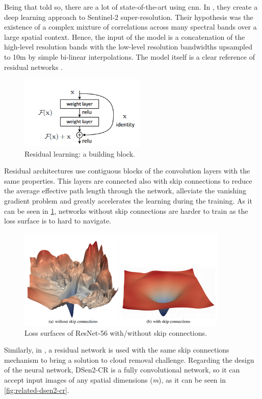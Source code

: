 \documentclass[../main.tex]{subfiles}
\begin{document}
Being that told so, there are a lot of state-of-the-art using \gls{cnn}. In \cite{LANARAS2018305}, they create a deep learning approach to Sentinel-2 super-resolution. Their hypothesis was the existence of a complex mixture of correlations across many spectral bands over a large spatial context. Hence, the input of the model is a concatenation of the high-level resolution bands with the low-level resolution bandwidths upsampled to 10m by simple bi-linear interpolations. The model itself is a clear reference of residual networks \cite{he2016deep}.
\begin{figure}[H]
	\centering
	\includegraphics[width=6cm]{imgs/relatedwork/residualblock.png}
	\caption{Residual learning: a building block.}
\end{figure}
Residual architectures use contiguous blocks of the convolution layers with the same properties. This layers are connected also with skip connections to reduce the average effective path length through the network, alleviate the vanishing gradient problem and greatly accelerates the learning during the training.  As it can be seen in \ref{fig:related-residual-loss}, networks without skip connections are harder to train as the loss surface is to hard to navigate. \cite{NEURIPS2018_a41b3bb3}
\begin{figure}[H]
	\centering
	\includegraphics[width=10cm]{imgs/relatedwork/resloss.png}
	\caption{Loss surfaces of ResNet-56 with/without skip connections.}
	\label{fig:related-residual-loss}
\end{figure}
Similarly, in \cite{Meraner2020}, a residual network is used with the same skip connections mechanism to bring a solution to cloud removal challenge.
Regarding the design of the neural network, DSen2-CR is a fully convolutional network, so it can accept input images of any spatial dimensions (\textit{m}), as it can be seen in \ref{fig:related-dsen2-cr}.
\end{document}
